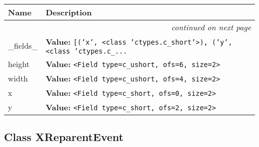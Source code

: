     \vspace{-1cm}
\hspace{\varindent}\begin{longtable}{|p{\varnamewidth}|p{\vardescrwidth}|l}
\cline{1-2}
\cline{1-2} \centering \textbf{Name} & \centering \textbf{Description}& \\
\cline{1-2}
\endhead\cline{1-2}\multicolumn{3}{r}{\small\textit{continued on next page}}\\\endfoot\cline{1-2}
\endlastfoot\raggedright \_\-f\-i\-e\-l\-d\-s\-\_\- & \raggedright \textbf{Value:} 
{\tt \texttt{[}\texttt{(}\texttt{'}\texttt{x}\texttt{'}\texttt{, }{\textless}class 'ctypes.c\_short'{\textgreater}\texttt{)}\texttt{, }\texttt{(}\texttt{'}\texttt{y}\texttt{'}\texttt{, }{\textless}class 'ctypes.c\_\texttt{...}}&\\
\cline{1-2}
\raggedright h\-e\-i\-g\-h\-t\- & \raggedright \textbf{Value:} 
{\tt {\textless}Field type=c\_ushort, ofs=6, size=2{\textgreater}}&\\
\cline{1-2}
\raggedright w\-i\-d\-t\-h\- & \raggedright \textbf{Value:} 
{\tt {\textless}Field type=c\_ushort, ofs=4, size=2{\textgreater}}&\\
\cline{1-2}
\raggedright x\- & \raggedright \textbf{Value:} 
{\tt {\textless}Field type=c\_short, ofs=0, size=2{\textgreater}}&\\
\cline{1-2}
\raggedright y\- & \raggedright \textbf{Value:} 
{\tt {\textless}Field type=c\_short, ofs=2, size=2{\textgreater}}&\\
\cline{1-2}
\end{longtable}



\subsection{Class XReparentEvent}

